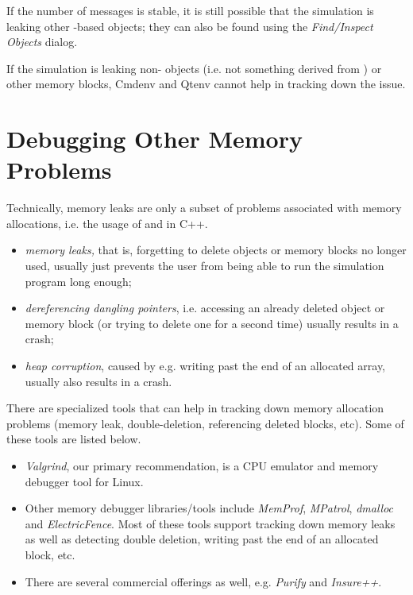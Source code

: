 If the number of messages is stable, it is still possible that the simulation
is leaking other -based objects; they can also be found
using the \textit{Find/Inspect Objects} dialog.

If the simulation is leaking non-{\opp} objects (i.e. not something derived
from ) or other memory blocks, Cmdenv and Qtenv cannot
help in tracking down the issue.


\section{Debugging Other Memory Problems}
\label{sec:run-sim:memory-leaks-and-crashes}

Technically, memory leaks are only a subset of problems associated with memory
allocations, i.e. the usage of  and  in C++.

\begin{itemize}
   \item \textit{memory leaks,} that is, forgetting to delete objects
     or memory blocks no longer used, usually just prevents the user from
     being able to run the simulation program long enough;
   \item \textit{dereferencing dangling pointers}, i.e. accessing
    an already deleted object or memory block (or trying to delete one
    for a second time) usually results in a crash;
   \item \textit{heap corruption}, caused by e.g. writing past the end of
   an allocated array, usually also results in a crash.
\end{itemize}


There are specialized tools that can help in tracking down memory allocation
problems (memory leak, double-deletion, referencing deleted blocks, etc). Some
of these tools are listed below.

\begin{itemize}
  \item \textit{Valgrind}, our primary recommendation, is a CPU emulator and
        memory debugger tool for Linux.
  \item Other memory debugger libraries/tools include \textit{MemProf},
        \textit{MPatrol}, \textit{dmalloc} and \textit{ElectricFence}.
        Most of these tools support tracking down memory leaks as well as
        detecting double deletion, writing past the end of an allocated block,
        etc.
  \item There are several commercial offerings as well, e.g. \textit{Purify}
        and \textit{Insure++}.
\end{itemize}


